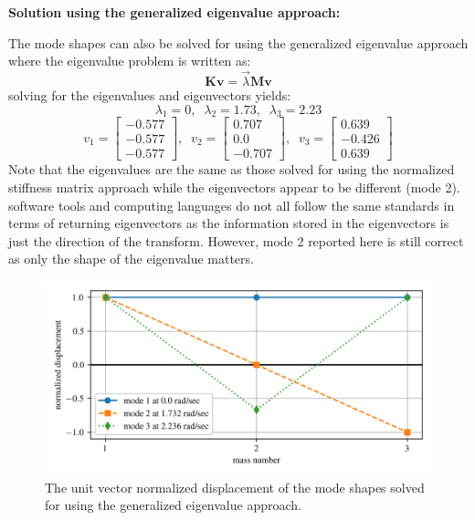 \documentclass[12pt,letter]{article}
\begin{document}
\begin{example}
	
	
	\vspace{2ex}
	\noindent \textbf{Solution using the generalized eigenvalue approach:}
	\vspace{1ex}
	
	The mode shapes can also be solved for using the generalized eigenvalue approach where the eigenvalue problem is written as:
	\begin{equation}
	\textbf{K}\textbf{v} = \vec{\lambda}\textbf{M}\textbf{v}
	\end{equation}
	solving for the eigenvalues and eigenvectors yields:
	\begin{equation}
	\lambda_1 = 0, \; \; \lambda_2 = 1.73, \; \; \lambda_3 = 2.23
	\end{equation}
	\begin{equation}
	v_1 = \begin{bmatrix} -0.577 \\    -0.577 \\   -0.577  \end{bmatrix}, \; \; v_2 = \begin{bmatrix} 0.707 \\    0.0 \\    -0.707 \end{bmatrix}, \; \; v_3 = \begin{bmatrix} 0.639 \\    -0.426 \\    0.639 \end{bmatrix}
	\end{equation}
	Note that the eigenvalues are the same as those solved for using the normalized stiffness matrix approach while the eigenvectors appear to be different (mode 2). software tools and computing languages do not all follow the same standards in terms of returning eigenvectors as the information stored in the eigenvectors is just the direction of the transform. However, mode 2 reported here is still correct as only the shape of the eigenvalue matters.
	
	\begin{figure}[H]
		\centering
		\includegraphics[width=\linewidth]{../figures/mode_shape_aiplane_example_generalized_eigenvalue.png}
		\caption{The unit vector normalized displacement of the mode shapes solved for using the generalized eigenvalue approach.}
		\label{fig:mode_shape_aiplane_example_generalized_eigenvalue}
	\end{figure}

	\end{example}
	
\end{document}
